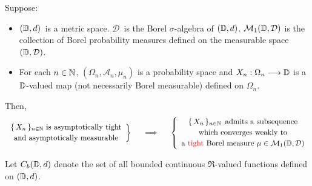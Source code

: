 \begin{theorem}
\label{ProkhorovTheorem}
\mbox{}\vskip 0.1cm
\noindent
Suppose:
\begin{itemize}
\item
	$(\mathbb{D},d)$\, is a metric space.
	$\mathcal{D}$\, is the Borel $\sigma$-algebra of $(\mathbb{D},d)$.
	\vskip 0.0cm
	$\mathcal{M}_{1}(\mathbb{D},\mathcal{D})$ is the collection of Borel probability measures
	defined on the measurable space $(\mathbb{D},\mathcal{D})$.
\item
	For each $n \in \mathbb{N}$,
	$(\Omega_{n},\mathcal{A}_{n},\mu_{n})$ is a probability space and
	$X_{n} : \Omega_{n} \longrightarrow \mathbb{D}$
	is a $\mathbb{D}$-valued map (not necessarily Borel measurable) defined on $\Omega_{n}$.
\end{itemize}
Then,
\begin{equation*}
	\left.\begin{array}{c}
	\textnormal{$\{\,X_{n}\,\}_{n\in\N}$ is asymptotically tight}
	\\
	\overset{{\color{white}.}}{\textnormal{and asymptotically measurable}}
	\end{array}\right\}
\quad\;\;\Longrightarrow\quad\;\,
	\left\{\begin{array}{c}
	\textnormal{$\{\,X_{n}\,\}_{n\in\N}$\, admits a subsequence}
	\\
	\textnormal{$\overset{{\color{white}.}}{\textnormal{which}}$ converges weakly to}
	\\
	\textnormal{a {\color{red}tight} $\overset{{\color{white}.}}{\textnormal{Borel}}$
		measure $\mu\in\mathcal{M}_{1}(\D,\mathcal{D})$}
	\end{array}\right.
\end{equation*}
\end{theorem}
\proof
Let $C_{b}(\mathbb{D},d)$ denote the set of all bounded continuous $\Re$-valued
functions defined on $(\mathbb{D},d)$.


